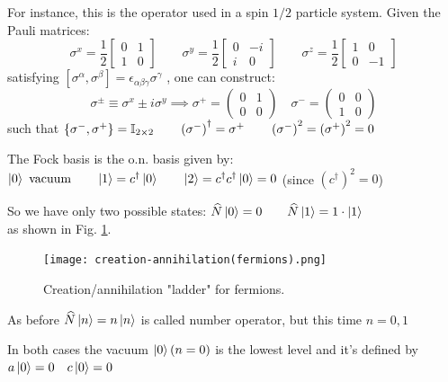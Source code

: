 \begin{itemize}
    For instance, this is the operator used in a spin $1/2$ particle system. Given the Pauli matrices:
    $$ \sigma^x = \frac 12\begin{bmatrix} 0 & 1 \\ 1& 0 \end{bmatrix} \qquad
    \sigma^y = \frac 12\begin{bmatrix} 0 & -i \\ i& 0 \end{bmatrix} \qquad
    \sigma^z = \frac 12\begin{bmatrix} 1 & 0 \\ 0 & -1 \end{bmatrix} $$
    satisfying $\left[\sigma^\alpha, \sigma^\beta\right] = \epsilon_{\alpha\beta\gamma}\sigma^\gamma$ , \qquad one can construct:
    $$\sigma^{\pm} \equiv \sigma ^x \pm i \sigma ^y \implies 
    \sigma^+ = \begin{pmatrix}0&1\\0&0\end{pmatrix} \quad
    \sigma^- = \begin{pmatrix}0&0\\1&0\end{pmatrix}$$
    such that \qquad $ \left\{\sigma^-, \sigma^+\right\} = \mathbb{I}_{2\times2} \qquad \left(\sigma^-\right)^\dag = \sigma^+ \qquad \left(\sigma^-\right)^2 = \left(\sigma^+\right)^2 = 0$
    
    The Fock basis is the o.n. basis given by: \\
    $\left|0\right\rangle \text{ vacuum} \qquad \left|1\right\rangle = c^\dag \left|0\right\rangle \qquad \left|2\right\rangle = c^\dag c^\dag \left|0\right\rangle = 0 $ \quad (since $\left(c^\dag\right)^2 = 0$)
    
    So we have only two possible states: $\widehat N \left|0\right\rangle = 0 \qquad \widehat N \left|1\right\rangle = 1\cdot \left|1\right\rangle$\\ as shown in Fig. \ref{fig:creation-annihilation(fermions)}.

    \begin{figure}[h]
        \centering
        \texttt{[image: creation-annihilation(fermions).png]}
        \caption{Creation/annihilation "ladder" for fermions.}
        \label{fig:creation-annihilation(fermions)}
    \end{figure}

    As before $\widehat N\left|n\right\rangle = n\left|n\right\rangle$ is called number operator, but this time $n = 0,1$
\end{itemize}
In both cases the vacuum $\left|0\right\rangle (n =0)$ is the lowest level and it's defined by $a\left|0\right\rangle= 0\quad  c \left|0\right\rangle = 0$

